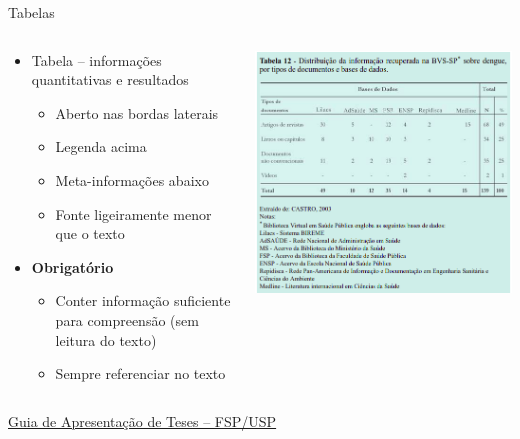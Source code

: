 \documentclass{beamer}
\begin{document}
\begin{frame}{Tabelas}
  \begin{columns}
    \begin{column}{.5\textwidth}
  \begin{itemize}
    \footnotesize
  \item Tabela -- informações quantitativas e resultados
    \begin{itemize}
      \scriptsize
    \item Aberto nas bordas laterais
    \item Legenda acima
    \item Meta-informações abaixo
    \item Fonte ligeiramente menor que o texto
    \end{itemize}
    \bigskip
  \item \alert{\bf Obrigatório}
    \begin{itemize}
      \scriptsize
    \item Conter informação suficiente para compreensão ({\tiny sem leitura do texto})
    \item Sempre referenciar no texto
    \end{itemize}
  \end{itemize}
    \end{column}
    \begin{column}{.5\textwidth}
      \includegraphics[height=.8\textheight]{EstruturaII/obj-tabela}
    \end{column}
  \end{columns}

  \vfill
  \scriptsize
  \hfill \href{http://www.biblioteca.fsp.usp.br/~biblioteca/guia/i_cap_04.htm}
  {Guia de Apresentação de Teses -- FSP/USP}
\end{frame}
\end{document}
